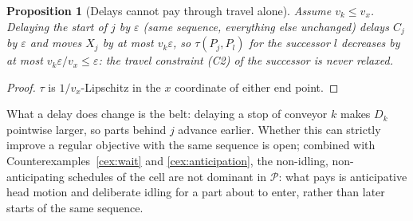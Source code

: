 \documentclass[11pt,a4paper]{article}
\theoremstyle{plain}
\newtheorem{proposition}{Proposition}
\theoremstyle{definition}
\theoremstyle{remark}
\newcommand{\Pb}{\mathcal{P}}
\begin{document}
\begin{proposition}[Delays cannot pay through travel alone]\label{prop:delay}
Assume $v_k\le v_x$. Delaying the start of $j$ by $\varepsilon$ (same sequence, everything
else unchanged) delays $C_j$ by $\varepsilon$ and moves $X_j$ by at most $v_k\varepsilon$,
so $\tau(P_j,P_l)$ for the successor $l$ decreases by at most $v_k\varepsilon/v_x\le\varepsilon$:
the travel constraint (C2) of the successor is never relaxed.
\end{proposition}
\begin{proof}
$\tau$ is $1/v_x$-Lipschitz in the $x$ coordinate of either end point.
\end{proof}
What a delay does change is the belt: delaying a stop of conveyor $k$ makes $D_k$
pointwise larger, so parts behind $j$ advance earlier. Whether this can strictly improve a
regular objective with the same sequence is open; combined with
Counterexamples~\ref{cex:wait} and \ref{cex:anticipation}, the non-idling,
non-anticipating schedules of the cell are not dominant in $\Pb$: what pays is
anticipative head motion and deliberate idling for a part about to enter, rather than
later starts of the same sequence.
\end{document}
